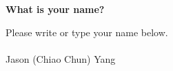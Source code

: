 \item {} {\bf What is your name?}

Please write or type your name below.\\\\
Jason (Chiao Chun) Yang
